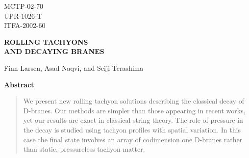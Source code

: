 \documentclass[a4paper,12pt]{article}
\begin{document}
\begin{center}
            \hfill    MCTP-02-70  \\
            \hfill    UPR-1026-T \\
            \hfill ITFA-2002-60 \\

\end{center}

\bigskip

\begin{center}
{\large \bf ROLLING TACHYONS \\
AND DECAYING BRANES }
\end{center}

\begin{center}
Finn Larsen\coordHE{}, Asad Naqvi\coordHE{}, and Seiji Terashima\coordHE{}
\end{center}

\begin{center}
\end{center}

\begin{center}
\end{center}

\begin{center}
\end{center}

\bigskip

\begin{center}
{\bf Abstract}
\end{center}

\begin{quotation}
We present new rolling tachyon solutions describing the classical decay of D-branes. 
Our methods are simpler than  those appearing in recent works, yet our results are exact in classical string theory. The role of  pressure in the decay is studied using tachyon profiles 
with spatial variation. In this case the final state involves an array of codimension one 
D-branes rather than static, pressureless tachyon matter. 
\end{quotation}
\end{document}
